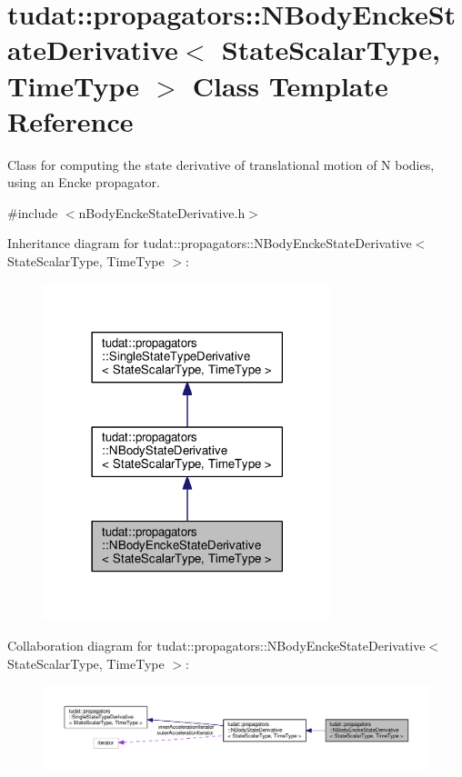 \hypertarget{classtudat_1_1propagators_1_1NBodyEnckeStateDerivative}{}\section{tudat\+:\+:propagators\+:\+:N\+Body\+Encke\+State\+Derivative$<$ State\+Scalar\+Type, Time\+Type $>$ Class Template Reference}
\label{classtudat_1_1propagators_1_1NBodyEnckeStateDerivative}


Class for computing the state derivative of translational motion of N bodies, using an Encke propagator.  




{\ttfamily \#include $<$n\+Body\+Encke\+State\+Derivative.\+h$>$}



Inheritance diagram for tudat\+:\+:propagators\+:\+:N\+Body\+Encke\+State\+Derivative$<$ State\+Scalar\+Type, Time\+Type $>$\+:
\nopagebreak
\begin{figure}[H]
\begin{center}
\leavevmode
\includegraphics[width=237pt]{classtudat_1_1propagators_1_1NBodyEnckeStateDerivative__inherit__graph}
\end{center}
\end{figure}


Collaboration diagram for tudat\+:\+:propagators\+:\+:N\+Body\+Encke\+State\+Derivative$<$ State\+Scalar\+Type, Time\+Type $>$\+:
\nopagebreak
\begin{figure}[H]
\begin{center}
\leavevmode
\includegraphics[width=350pt]{classtudat_1_1propagators_1_1NBodyEnckeStateDerivative__coll__graph}
\end{center}
\end{figure}
